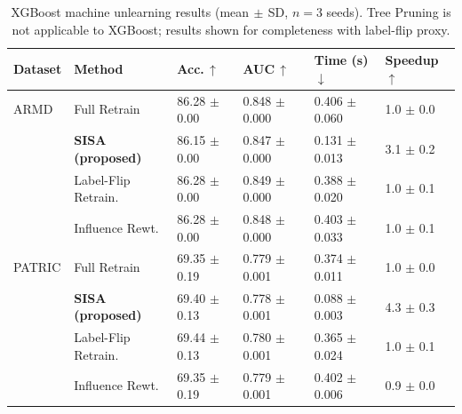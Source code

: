 \begin{table}[htbp]
\centering
\caption{XGBoost machine unlearning results (mean$\,\pm\,$SD, $n=3$ seeds). Tree Pruning is not applicable to XGBoost; results shown for completeness with label-flip proxy.}
\label{tab:xgboost}
\renewcommand{\arraystretch}{1.25}
\begin{tabular}{L{2.0cm} L{3.0cm} C{2.3cm} C{2.0cm} C{2.2cm} C{1.6cm}}
\toprule
\textbf{Dataset} & \textbf{Method} & \textbf{Acc.\,$\uparrow$} & \textbf{AUC\,$\uparrow$} & \textbf{Time (s)\,$\downarrow$} & \textbf{Speedup\,$\uparrow$} \\
\midrule
ARMD & Full Retrain & 86.28 $\pm$ 0.00 & 0.848 $\pm$ 0.000 & 0.406 $\pm$ 0.060 & 1.0 $\pm$ 0.0 \\
 & \textbf{SISA (proposed)} & 86.15 $\pm$ 0.00 & 0.847 $\pm$ 0.000 & 0.131 $\pm$ 0.013 & 3.1 $\pm$ 0.2 \\
 & Label-Flip Retrain. & 86.28 $\pm$ 0.00 & 0.849 $\pm$ 0.000 & 0.388 $\pm$ 0.020 & 1.0 $\pm$ 0.1 \\
 & Influence Rewt. & 86.28 $\pm$ 0.00 & 0.848 $\pm$ 0.000 & 0.403 $\pm$ 0.033 & 1.0 $\pm$ 0.1 \\
\midrule
PATRIC & Full Retrain & 69.35 $\pm$ 0.19 & 0.779 $\pm$ 0.001 & 0.374 $\pm$ 0.011 & 1.0 $\pm$ 0.0 \\
 & \textbf{SISA (proposed)} & 69.40 $\pm$ 0.13 & 0.778 $\pm$ 0.001 & 0.088 $\pm$ 0.003 & 4.3 $\pm$ 0.3 \\
 & Label-Flip Retrain. & 69.44 $\pm$ 0.13 & 0.780 $\pm$ 0.001 & 0.365 $\pm$ 0.024 & 1.0 $\pm$ 0.1 \\
 & Influence Rewt. & 69.35 $\pm$ 0.19 & 0.779 $\pm$ 0.001 & 0.402 $\pm$ 0.006 & 0.9 $\pm$ 0.0 \\
\bottomrule
\end{tabular}
\end{table}